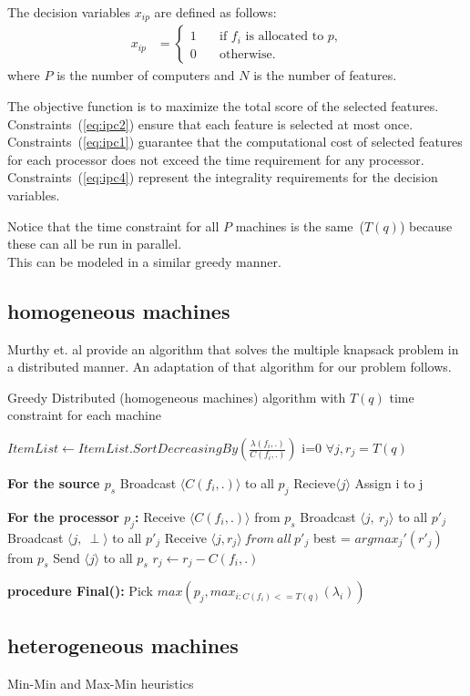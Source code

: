 \documentclass[10pt, conference, compsocconf]{IEEEtran}
\begin{document}
The decision variables $x_{ip}$ are defined as follows:
\begin{align} x_{ip} &=
\begin{cases} 
1 & \quad \text{if $f_i$ is allocated to $p$,}\\
0 & \quad \text{otherwise.}
\end{cases} 
\end{align} 
where $P$ is the number of computers and $N$ is the number of features. 

The objective function is to maximize the total score of the selected features. 
Constraints~(\ref{eq:ipc2}) ensure that each feature is selected at most once. 
Constraints~(\ref{eq:ipc1}) guarantee that 
the computational cost of selected features for each processor does 
not exceed the time requirement for any processor.
Constraints~(\ref{eq:ipc4}) 
represent the integrality requirements for the decision variables. 

Notice that the time constraint for all $P$ machines is the same~($T(q)$) because these can all be run in parallel.\\
This can be modeled in a similar greedy manner.

\subsection{homogeneous machines}
Murthy et. al \cite{murthy2017distributed} provide an algorithm that solves the multiple knapsack problem in a distributed manner.
An adaptation of that algorithm for our problem follows.
\begin{algorithm}[H]
 \caption{Greedy Distributed (homogeneous machines) algorithm with $T(q)$ time constraint for each machine }
 \begin{algorithmic}[1]
 \renewcommand{\algorithmicrequire}{\textbf{Input:}}
 \renewcommand{\algorithmicensure}{\textbf{Output:}}
  \STATE $ItemList \leftarrow ItemList.SortDecreasingBy(\frac{\lambda(f_i, .)}{C(f_i, .)})$
\STATE i=0
\STATE $\forall j, r_j = T(q)$

\textbf{For the source $p_s$}
  \STATE Broadcast $\langle C(f_i, .)\rangle$ to all $p_j$
\STATE Recieve$ \langle j \rangle$
\STATE Assign i to j
\ENDFOR

\textbf{For the processor $p_j$:}
\STATE Receive $\langle C(f_i, .) \rangle$ from $p_s$
\STATE Broadcast $\langle j,\ r_j \rangle$  to all $ p'_j$
\ELSE 
\STATE Broadcast $\langle j,\ \perp \rangle$  to all $ p'_j$
\ENDIF
\STATE Receive $\langle j, r_j \rangle\ from\ all\ p'_j$
best = $argmax_j'(r'_j)$ from $p_s$
\STATE Send $\langle j \rangle$ to all $p_s$
\STATE $r_j \leftarrow r_j -C(f_i, .)$
\ENDIF

 \textbf{procedure Final():}
\STATE Pick $max(p_j, max_{i:C(f_i)<= T(q)}(\lambda_i) )$
\ENDFOR 
 \end{algorithmic}
 \end{algorithm}
\subsection{heterogeneous machines}
Min-Min and Max-Min heuristics

{\tiny
\newcommand{\BIBdecl}{\setlength{\itemsep}{0.2 em}}


}

\end{document}
